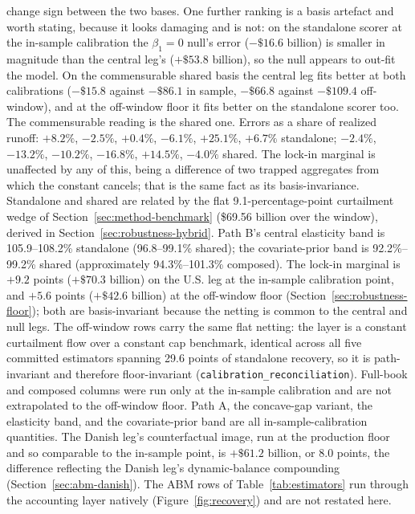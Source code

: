 \documentclass[12pt]{article}
\begin{document}
\begin{table}[H]
\begin{threeparttable}
\begin{tablenotes}[flushleft]
change sign between the two bases. One further ranking is a basis artefact and worth stating, because it looks damaging and is not: on the standalone scorer at the in-sample calibration the $\beta_1 = 0$ null's error ($-\$16.6$ billion) is smaller in magnitude than the central leg's ($+\$53.8$ billion), so the null appears to out-fit the model. On the commensurable shared basis the central leg fits better at both calibrations ($-\$15.8$ against $-\$86.1$ in sample, $-\$66.8$ against $-\$109.4$ off-window), and at the off-window floor it fits better on the standalone scorer too. The commensurable reading is the shared one. Errors as a share of realized runoff: $+8.2\%$, $-2.5\%$, $+0.4\%$, $-6.1\%$, $+25.1\%$, $+6.7\%$ standalone; $-2.4\%$, $-13.2\%$, $-10.2\%$, $-16.8\%$, $+14.5\%$, $-4.0\%$ shared. The lock-in marginal is unaffected by any of this, being a difference of two trapped aggregates from which the constant cancels; that is the same fact as its basis-invariance. Standalone and shared are related by the flat 9.1-percentage-point curtailment wedge of Section~\ref{sec:method-benchmark} (\$69.56 billion over the window), derived in Section~\ref{sec:robustness-hybrid}. Path B's central elasticity band is 105.9--108.2\% standalone (96.8--99.1\% shared); the covariate-prior band is 92.2\%--99.2\% shared (approximately 94.3\%--101.3\% composed). The lock-in marginal is $+9.2$ points ($+\$70.3$ billion) on the U.S. leg at the in-sample calibration point, and $+5.6$ points ($+\$42.6$ billion) at the off-window floor (Section~\ref{sec:robustness-floor}); both are basis-invariant because the netting is common to the central and null legs. The off-window rows carry the same flat netting: the layer is a constant curtailment flow over a constant cap benchmark, identical across all five committed estimators spanning 29.6 points of standalone recovery, so it is path-invariant and therefore floor-invariant (\texttt{calibration\_reconciliation}). Full-book and composed columns were run only at the in-sample calibration and are not extrapolated to the off-window floor. Path A, the concave-gap variant, the elasticity band, and the covariate-prior band are all in-sample-calibration quantities. The Danish leg's counterfactual image, run at the production floor and so comparable to the in-sample point, is $+\$61.2$ billion, or 8.0 points, the difference reflecting the Danish leg's dynamic-balance compounding (Section~\ref{sec:abm-danish}). The ABM rows of Table~\ref{tab:estimators} run through the accounting layer natively (Figure~\ref{fig:recovery}) and are not restated here.
\end{tablenotes}
\end{threeparttable}
\end{table}
\end{document}
